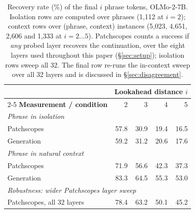 \begin{table}[t]
\centering\small
\begin{tabular}{lrrrr}
\toprule
& \multicolumn{4}{c}{\textbf{Lookahead distance} $i$} \\
\cmidrule(lr){2-5}
\textbf{Measurement / condition} & 2 & 3 & 4 & 5 \\
\midrule
\multicolumn{5}{l}{\textit{Phrase in isolation}} \\
\quad Patchscopes & 57.8 & 30.9 & 19.4 & 16.5 \\
\quad Generation & 59.2 & 31.2 & 20.6 & 17.6 \\
\midrule
\multicolumn{5}{l}{\textit{Phrase in natural context}} \\
\quad Patchscopes & 71.9 & 56.6 & 42.3 & 37.3 \\
\quad Generation & 83.3 & 64.5 & 55.3 & 53.0 \\
\midrule
\multicolumn{5}{l}{\textit{Robustness: wider Patchscopes layer sweep}} \\
\quad Patchscopes, all 32 layers & 78.4 & 63.2 & 50.1 & 45.2 \\
\bottomrule
\end{tabular}
\caption{Recovery rate (\%) of the final $i$ phrase tokens, OLMo-2-7B.
Isolation rows are computed over phrases
(1,112 at $i=2$); context rows over
(phrase, context) instances (5,023,
4,651,
2,606 and
1,333 at $i=2\ldots5$).
Patchscopes counts a success if \emph{any} probed layer recovers the
continuation, over the eight layers used throughout this paper
(\S\ref{sec:setup}); isolation rows sweep all 32. The final row re-runs the
in-context sweep over all 32 layers and is discussed in
\S\ref{sec:disagreement}.}
\label{tab:main}
\end{table}
